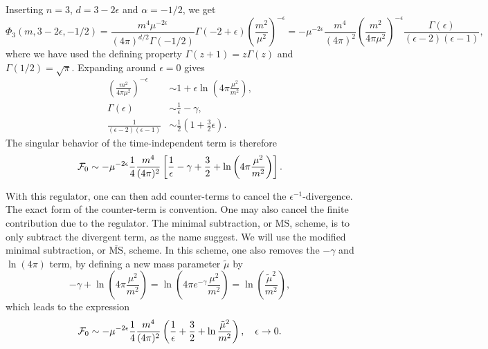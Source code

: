 Inserting $n=3$, $d = 3 - 2\epsilon$ and $\alpha = -1/2$, we get
\begin{equation}
    \Phi_3(m, 3 - 2\epsilon, -1/2)
    =
    \frac{m^4 \mu^{-2\epsilon}}{(4 \pi)^{d/2}\Gamma(-1/2)} \Gamma(-2 + \epsilon) \left(\frac{m^2}{\mu^2}\right)^{-\epsilon}
    =
    - \mu^{-2\epsilon} \frac{m^4}{(4 \pi)^{2}}
    \left(\frac{m^2}{4 \pi \mu^2}\right)^{- \epsilon}
    \frac{\Gamma(\epsilon)}{(\epsilon - 2)(\epsilon - 1)},
\end{equation}
where we have used the defining property $\Gamma(z + 1) = z\Gamma(z)$ and $\Gamma(1/2) = \sqrt \pi$.
Expanding around $\epsilon = 0$ gives
\begin{align}
    \left(\frac{m^2}{4 \pi \mu^2}\right)^{- \epsilon}
    &\sim 1 + \epsilon \ln\left(4 \pi \frac{\mu^2}{m^2}\right),\\
    \Gamma(\epsilon) 
    & \sim \frac{1}{\epsilon} - \gamma, \\
    \frac{1}{(\epsilon - 2)(\epsilon - 1)}
    &\sim \frac{1}{2}\left(1 + \frac{3}{2} \epsilon\right).
\end{align}
The singular behavior of the time-independent term is therefore
\begin{align}
    \mathcal{F}_0 \sim
    - \mu^{-2\epsilon} \frac{1}{4}\frac{m^4}{(4 \pi)^2}
    \left[
        \frac{1}{\epsilon} 
        - \gamma + \frac{3}{2}
        + \ln\left(4 \pi \frac{\mu^2}{m^2}\right)
    \right].
\end{align}

With this regulator, one can then add counter-terms to cancel the $\epsilon^{-1}$-divergence.
The exact form of the counter-term is convention.
One may also cancel the finite contribution due to the regulator.
The minimal subtraction, or $\mathrm{MS}$, scheme, is to only subtract the divergent term, as the name suggest.
We will use the modified minimal subtraction, or $\overline{ \mathrm{MS}}$, scheme.
In this scheme, one also removes the $-\gamma$ and $\ln(4 \pi)$ term, by defining a new mass parameter $\tilde \mu$ by
\begin{equation}
    \label{definition mu tilde MS bar}
    -\gamma + \ln(4\pi \frac{\mu^2}{m^2}) = \ln(4\pi e^{-\gamma} \frac{\mu^2}{m^2}) = \ln(\frac{\tilde\mu^2}{m^2}),
\end{equation}
which leads to the expression
\begin{equation}
    \label{free field regularized energy}
    \mathcal{F}_0 \sim
    - \mu^{-2\epsilon} \frac{1}{4}\frac{m^4}{(4 \pi)^2}
    \left(
        \frac{1}{\epsilon} 
        + \frac{3}{2}
        + \ln \frac{\tilde\mu^2}{m^2}
    \right), \quad \epsilon \rightarrow 0.
\end{equation}

